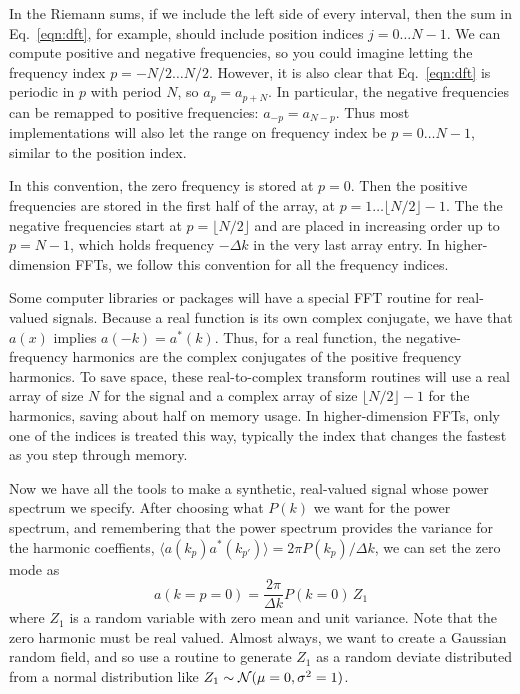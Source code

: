 In the Riemann sums, if we include the left side of every interval, then the sum in Eq.~\ref{eqn:dft}, for example, should include position indices $j = 0 \dots N-1$.  We can compute positive and negative frequencies, so you could imagine letting the frequency index $p = -N/2 \dots N/2$.  However, it is also clear that Eq.~\ref{eqn:dft} is periodic in $p$ with period $N$, so $a_p = a_{p+N}$.  In particular, the negative frequencies can be remapped to positive frequencies: $a_{-p} = a_{N-p}$.  Thus most implementations will also let the range on frequency index be $p = 0 \dots N-1$, similar to the position index.

In this convention, the zero frequency is stored at $p=0$.  Then the positive frequencies are stored in the first half of the array, at $p=1 \dots \lfloor N/2 \rfloor -1$.  The the negative frequencies start at $p =  \lfloor N/2 \rfloor$ and are placed in increasing order up to $p = N-1$, which holds frequency $-\Delta k$ in the very last array entry.  In higher-dimension FFTs, we follow this convention for all the frequency indices.

Some computer libraries or packages will have a special FFT routine for real-valued signals.    Because a real function is its own complex conjugate, we have that $a(x)$ implies $a(-k) = a^*(k)$.  Thus, for a real function, the negative-frequency harmonics are the complex conjugates of the positive frequency harmonics.  To save space, these real-to-complex transform routines will use a real array of size $N$ for the signal and a complex array of size $\lfloor N/2 \rfloor - 1$ for the harmonics, saving about half on memory usage.  In higher-dimension FFTs, only one of the indices is treated this way, typically the index that changes the fastest as you step through memory.

Now we have all the tools to make a synthetic, real-valued signal whose power spectrum we specify.  After choosing what $P(k)$ we want for the power spectrum, and remembering that the power spectrum provides the variance for the harmonic coeffients, $ \langle a(k_p) a^*(k_{p'}) \rangle = 2\pi P(k_p) / \Delta k$, we can set the zero mode as
\begin{equation}
  a(k = p =0) =  \frac{2\pi}{\Delta k } P(k = 0)\, Z_1
\end{equation}
where $Z_1$ is a random variable with zero mean and unit variance.  Note that the zero harmonic must be real valued.  Almost always, we want to create a Gaussian random field, and so use a routine to generate $Z_1$ as a random deviate distributed from a normal distribution like $Z_1 \sim {\cal N}(\mu = 0, \sigma^2 = 1)$.

